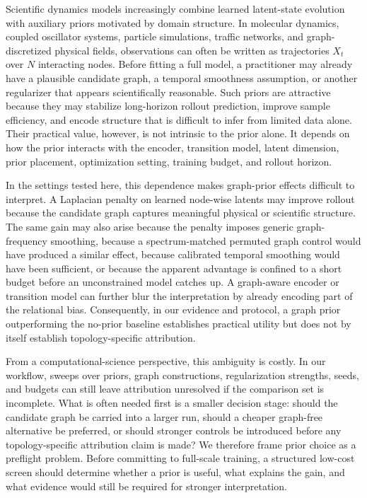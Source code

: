 \documentclass[preprint,12pt]{elsarticle}
\begin{document}
Scientific dynamics models increasingly combine learned latent-state evolution with auxiliary priors motivated by domain structure. In molecular dynamics, coupled oscillator systems, particle simulations, traffic networks, and graph-discretized physical fields, observations can often be written as trajectories $X_t$ over $N$ interacting nodes. Before fitting a full model, a practitioner may already have a plausible candidate graph, a temporal smoothness assumption, or another regularizer that appears scientifically reasonable. Such priors are attractive because they may stabilize long-horizon rollout prediction, improve sample efficiency, and encode structure that is difficult to infer from limited data alone. Their practical value, however, is not intrinsic to the prior alone. It depends on how the prior interacts with the encoder, transition model, latent dimension, prior placement, optimization setting, training budget, and rollout horizon.

In the settings tested here, this dependence makes graph-prior effects difficult to interpret. A Laplacian penalty on learned node-wise latents may improve rollout because the candidate graph captures meaningful physical or scientific structure. The same gain may also arise because the penalty imposes generic graph-frequency smoothing, because a spectrum-matched permuted graph control would have produced a similar effect, because calibrated temporal smoothing would have been sufficient, or because the apparent advantage is confined to a short budget before an unconstrained model catches up. A graph-aware encoder or transition model can further blur the interpretation by already encoding part of the relational bias. Consequently, in our evidence and protocol, a graph prior outperforming the no-prior baseline establishes practical utility but does not by itself establish topology-specific attribution.

From a computational-science perspective, this ambiguity is costly. In our workflow, sweeps over priors, graph constructions, regularization strengths, seeds, and budgets can still leave attribution unresolved if the comparison set is incomplete. What is often needed first is a smaller decision stage: should the candidate graph be carried into a larger run, should a cheaper graph-free alternative be preferred, or should stronger controls be introduced before any topology-specific attribution claim is made? We therefore frame prior choice as a preflight problem. Before committing to full-scale training, a structured low-cost screen should determine whether a prior is useful, what explains the gain, and what evidence would still be required for stronger interpretation.
\end{document}
